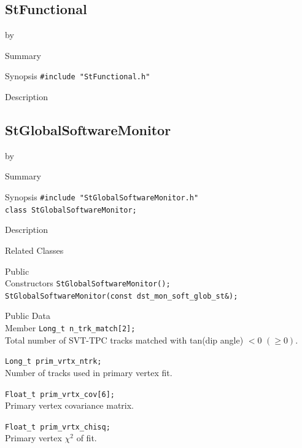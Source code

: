 \documentclass[twoside]{article}
\newcommand{\entrylabel}[1]{\mbox{\textbf{{#1}}}\hfil}%
\newenvironment{entry}
{\begin{list}{}%
    {\renewcommand{\makelabel}{\entrylabel}%
     \setlength{\labelwidth}{90pt}%
     \setlength{\leftmargin}{\labelwidth}
     \advance\leftmargin by \labelsep%
      }%
    }%
  {\end{list}}
\newcommand{\Entrylabel}[1]%
{\raisebox{0pt}[1ex][0pt]{\makebox[\labelwidth][l]%
    {\parbox[t]{\labelwidth}{\hspace{0pt}\textbf{{#1}}}}}}
\newenvironment{Entry}%
{\renewcommand{\entrylabel}{\Entrylabel}\begin{entry}}%
  {\end{entry}}
\begin{document}
\subsection{StFunctional}
\label{sec:StFunctional}
\begin{Entry}
\item[Summary]
\item[Synopsis]
    \verb+#include "StFunctional.h"+\\
\item[Description]
\end{Entry}
\clearpage


\subsection{StGlobalSoftwareMonitor}
\label{sec:StGlobalSoftwareMonitor}
\begin{Entry}
\item[Summary]
\item[Synopsis]
    \verb+#include "StGlobalSoftwareMonitor.h"+\\
    \verb+class StGlobalSoftwareMonitor;+\\
\item[Description]
\item[Related Classes]
\item[Public\\ Constructors]
    \verb+StGlobalSoftwareMonitor();+\\
    \verb+StGlobalSoftwareMonitor(const dst_mon_soft_glob_st&);+\\
\item[Public Data\\ Member]
    \verb+Long_t n_trk_match[2];+\\
    Total number of SVT-TPC tracks matched with tan(dip angle) $< 0$
    $(\ge 0)$.

    \verb+Long_t prim_vrtx_ntrk;+\\
    Number of tracks used in primary vertex fit.

    \verb+Float_t prim_vrtx_cov[6];+\\
    Primary vertex covariance matrix.

    \verb+Float_t prim_vrtx_chisq;+\\
    Primary vertex $\chi^2$ of fit.
\end{Entry}
\clearpage
\end{document}
